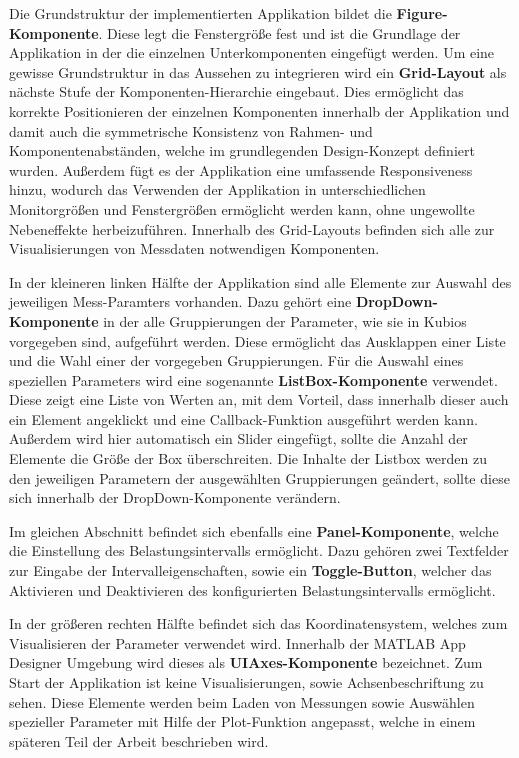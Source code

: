 \begin{minipage}{\linewidth}

\end{minipage}

Die Grundstruktur der implementierten Applikation bildet die \textbf{Figure-Komponente}. Diese legt die Fenstergröße fest und ist die Grundlage der Applikation in der die einzelnen Unterkomponenten eingefügt werden. Um eine gewisse Grundstruktur in das Aussehen zu integrieren wird ein \textbf{Grid-Layout} als nächste Stufe der Komponenten-Hierarchie eingebaut. Dies ermöglicht das korrekte Positionieren der einzelnen Komponenten innerhalb der Applikation und damit auch die symmetrische Konsistenz von Rahmen- und Komponentenabständen, welche im grundlegenden Design-Konzept definiert wurden. Außerdem fügt es der Applikation eine umfassende Responsiveness hinzu, wodurch das Verwenden der Applikation in unterschiedlichen Monitorgrößen und Fenstergrößen ermöglicht werden kann, ohne ungewollte Nebeneffekte herbeizuführen. Innerhalb des Grid-Layouts befinden sich alle zur Visualisierungen von Messdaten notwendigen Komponenten. 

In der kleineren linken Hälfte der Applikation sind alle Elemente zur Auswahl des jeweiligen Mess-Paramters vorhanden. Dazu gehört eine \textbf{DropDown-Komponente} in der alle Gruppierungen der Parameter, wie sie in Kubios vorgegeben sind, aufgeführt werden. Diese ermöglicht das Ausklappen einer Liste und die Wahl einer der vorgegeben Gruppierungen. Für die Auswahl eines speziellen Parameters wird eine sogenannte \textbf{ListBox-Komponente} verwendet. Diese zeigt eine Liste von Werten an, mit dem Vorteil, dass innerhalb dieser auch ein Element angeklickt und eine Callback-Funktion ausgeführt werden kann. Außerdem wird hier automatisch ein Slider eingefügt, sollte die Anzahl der Elemente die Größe der Box überschreiten. Die Inhalte der Listbox werden zu den jeweiligen Parametern der ausgewählten Gruppierungen geändert, sollte diese sich innerhalb der DropDown-Komponente verändern.

Im gleichen Abschnitt befindet sich ebenfalls eine \textbf{Panel-Komponente}, welche die Einstellung des Belastungsintervalls ermöglicht. Dazu gehören zwei Textfelder zur Eingabe der Intervalleigenschaften, sowie ein \textbf{Toggle-Button}, welcher das Aktivieren und Deaktivieren des konfigurierten Belastungsintervalls ermöglicht.

In der größeren rechten Hälfte befindet sich das Koordinatensystem, welches zum Visualisieren der Parameter verwendet wird. Innerhalb der MATLAB App Designer Umgebung wird dieses als \textbf{UIAxes-Komponente} bezeichnet. Zum Start der Applikation ist keine Visualisierungen, sowie Achsenbeschriftung zu sehen. Diese Elemente werden beim Laden von Messungen sowie Auswählen spezieller Parameter mit Hilfe der Plot-Funktion angepasst, welche in einem späteren Teil der Arbeit beschrieben wird.

